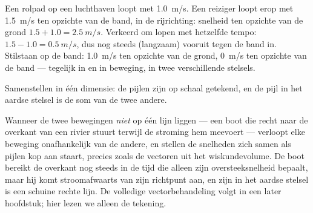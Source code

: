 \begin{example}\label{ex:g10:relative-motion:walkway}
Een rolpad op een luchthaven loopt met \qty{1.0}{m/s}. Een reiziger loopt
erop met \qty{1.5}{m/s} ten opzichte van de band, in de rijrichting:
snelheid ten opzichte van de grond $1.5 + 1.0 = \qty{2.5}{m/s}$.
Verkeerd om lopen met hetzelfde tempo: $1.5 - 1.0 = \qty{0.5}{m/s}$, dus
nog steeds (langzaam) vooruit tegen de band in. Stilstaan op de band:
\qty{1.0}{m/s} ten opzichte van de grond, \qty{0}{m/s} ten opzichte van
de band --- tegelijk in  en in beweging, in twee verschillende
stelsels.
\end{example}

\begin{omfigure}

{\small Samenstellen in één dimensie: de pijlen zijn op schaal getekend,
en de pijl in het aardse stelsel is de som van de twee andere.}
\end{omfigure}

\begin{remark}\label{rem:g10:relative-motion:twodim}
Wanneer de twee bewegingen \emph{niet} op één lijn liggen --- een boot
die recht naar de overkant van een rivier stuurt terwijl de stroming hem
meevoert --- verloopt elke beweging onafhankelijk van de andere, en
stellen de snelheden zich samen als pijlen kop aan staart, precies zoals
de vectoren uit het wiskundevolume. De boot bereikt de overkant nog
steeds in de tijd die alleen zijn oversteeksnelheid bepaalt, maar hij
komt stroomafwaarts van zijn richtpunt aan, en zijn  in het aardse
stelsel is een schuine rechte lijn. De volledige vectorbehandeling volgt
in een later hoofdstuk; hier lezen we alleen de tekening.
\end{remark}

